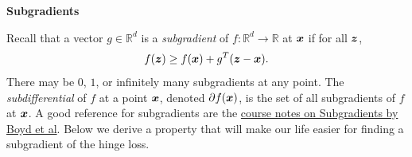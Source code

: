 \documentclass{article}
\newcommand{\nyuparagrah}[1]{\textcolor{nyupurple}{\large #1}}
\theoremstyle{plain}
\theoremstyle{definition}
\begin{document}
\nyuparagrah{\bf Subgradients} 

Recall that a vector $g\in\mathbb{R}^{d}$ is a \emph{subgradient} of
$f:\mathbb{R}^{d}\to\mathbb{R}$ at $\boldsymbol{x}$ if for all $\boldsymbol{z}$, 
\[
f(\boldsymbol{z})\ge f(\boldsymbol{x})+g^{T}(\boldsymbol{z}- \boldsymbol{x}).
\]
There may be $0$, $1$, or infinitely many
subgradients at any point. The \emph{subdifferential} of $f$ at
a point $\boldsymbol{x}$, denoted $\partial f(\boldsymbol{x})$, is the set of all subgradients
of $f$ at $\boldsymbol{x}$. 
  A good reference for subgradients are the \href{https://stanford.edu/class/ee364b/lectures/subgradients_notes.pdf}{course notes on Subgradients by Boyd et al}.
Below we derive a property
that will make our life easier for finding a subgradient of the hinge
loss.
\end{document}
